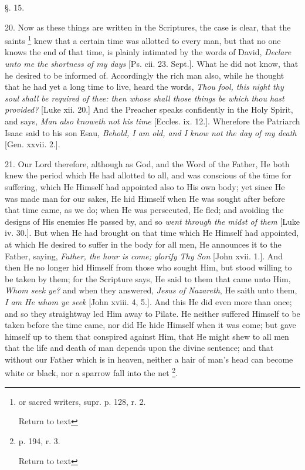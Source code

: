 §. 15.

20. Now as these things are written in the
Scriptures, the case is clear, that the saints \footnote{or sacred writers, supr. p. 128, r. 2.

Return to text} knew that a certain time was allotted to every man, but that no
one knows the end of that time, is plainly intimated by the words of
David, \emph{Declare unto me the shortness of my days} [Ps. cii. 23.
Sept.]. What he did not know, that he desired to be informed of.
Accordingly the rich man also, while he thought that he had yet a long
time to live, heard the words, \emph{Thou fool, this night thy soul shall
be required of thee: then whose shall those things be which thou hast
provided?} [Luke xii. 20.] And the Preacher speaks confidently in
the Holy Spirit, and says, \emph{Man also knoweth not his time}
[Eccles. ix. 12.]. Wherefore the Patriarch Isaac said to his son Esau,
\emph{Behold, I am old, and I know not the day of my death} [Gen.
xxvii. 2.].

21. Our Lord therefore, although as God, and the
Word of the Father, He both knew the period which He had allotted to
all, and was conscious of the time for suffering, which He Himself had
appointed also to His own body; yet since He was made man for our
sakes, He hid Himself when He was sought after before that time came,
as we do; when He was persecuted, He fled; and avoiding the designs of
His enemies He passed by, and so \emph{went through the midst of them}
[Luke iv. 30.]. But when He had brought on that time which He Himself
had appointed, at which He desired to suffer in the body for all men,
He announces it to the Father, saying, \emph{Father, the hour is come;
glorify Thy Son} [John xvii. 1.]. And then He no longer hid Himself
from those who sought Him, but stood willing to be taken by them; for
the Scripture says, He said to them that came unto Him, \emph{Whom seek
ye?} and when they answered, \emph{Jesus of Nazareth}, He saith
unto them, \emph{I am He whom ye seek} [John xviii. 4, 5.]. And this
He did even more than once; and so they straightway led Him away to
Pilate. He neither suffered Himself to be taken before the time came,
nor did He hide Himself when it was come; but gave himself up to them
that conspired against Him, that He might shew to all men that the
life and death of man depends upon the divine sentence; and that
without our Father which is in heaven, neither a hair of man's head
can become white or black, nor a sparrow fall into the net \footnote{p. 194, r. 3.

Return to text}.

